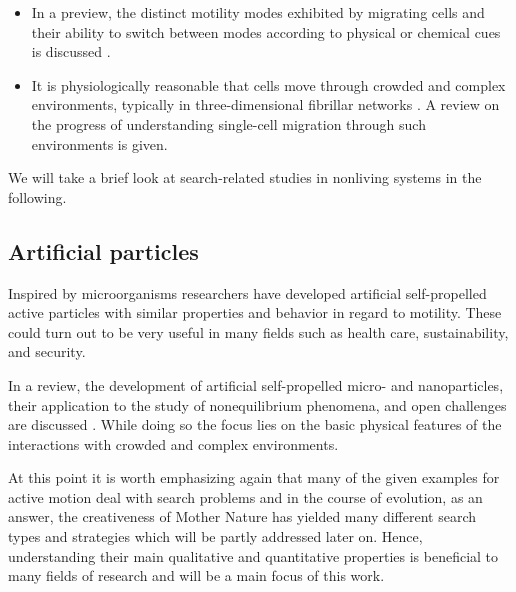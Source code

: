 \begin{itemize}
 \item %
 In a preview, the distinct motility modes exhibited by migrating cells and their ability to switch between modes according to physical or chemical cues is discussed \cite{welch:2015}.
 \item %
 It is physiologically reasonable that cells move through crowded and complex environments, typically in three-dimensional fibrillar networks \cite{mak:2016}. A review on the progress of understanding single-cell migration through such environments is given.
\end{itemize}
 We will take a brief look at search-related studies in nonliving systems in the following.
 
 \subsection*{Artificial particles}
 Inspired by microorganisms researchers have developed artificial self-propelled active particles with similar properties and behavior in regard to motility. These could turn out to be very useful in many fields such as \eg health care, sustainability, and security.
 
 In a review, the development of artificial self-propelled micro- and nanoparticles, their application to the study of nonequilibrium phenomena, and open challenges are discussed \cite{bechinger:2016}. While doing so the focus lies on the basic physical features of the interactions with crowded and complex environments.
 
\bigskip
 
\noindent At this point it is worth emphasizing again that many of the given examples for active motion deal with search problems and in the course of evolution, as an answer, the creativeness of Mother Nature has yielded many different search types and strategies which will be partly addressed later on. Hence, understanding their main qualitative and quantitative properties is beneficial to many fields of research and will be a main focus of this work.



